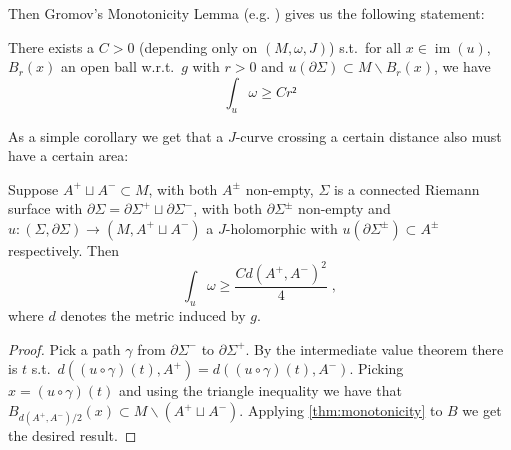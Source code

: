 \documentclass[12pt,a4paper,draft]{scrartcl}
\DeclareMathOperator{\im}{im}
\begin{document}
Then Gromov's Monotonicity Lemma (e.g. \cite[Proposition 4.3.1 (ii)]{sikorav1994}) gives us the following statement:

\begin{lemma}[Monotonicity]
  \label{thm:monotonicity}
  There exists a $C>0$ (depending only on $(M,ω,J)$) s.t.\ for all $x ∈ \im(u)$, $B_r(x)$ an open ball w.r.t.\ $g$ with $r > 0$ and $u(∂Σ) ⊂ M ∖ B_r(x)$, we have
  \[∫_u ω ≥ C r²\]
\end{lemma}

As a simple corollary we get that a $J$-curve crossing a certain distance also must have a certain area:

\begin{corollary}
  \label{thm:small_buffer}
  Suppose $A^+ ⊔ A^- ⊂ M$, with both $A^±$ non-empty, $Σ$ is a connected Riemann surface with $∂Σ = ∂Σ^+ ⊔ ∂Σ^-$, with both $∂Σ^±$ non-empty and $u\colon (Σ,∂Σ) → (M,A^+ ⊔ A^-)$ a $J$-holomorphic with $u(∂Σ^±) ⊂ A^±$ respectively.
  Then
  \[∫_u ω ≥ \frac{C d(A^+,A^-)^2}{4} \; ,\]
  where $d$ denotes the metric induced by $g$.
\end{corollary}

\begin{proof}
  Pick a path $γ$ from $∂Σ^-$ to $∂Σ^+$. By the intermediate value theorem there is $t$ s.t.\ $d((u ∘ γ) (t),A^+) = d((u ∘ γ)(t), A^-)$. Picking $x = (u ∘ γ)(t)$ and using the triangle inequality we have that $B_{d(A^+,A^-)/2}(x) ⊂ M ∖ ( A^+ ⊔ A^-) $. Applying \cref{thm:monotonicity} to $B$ we get the desired result.
\end{proof}
\end{document}
